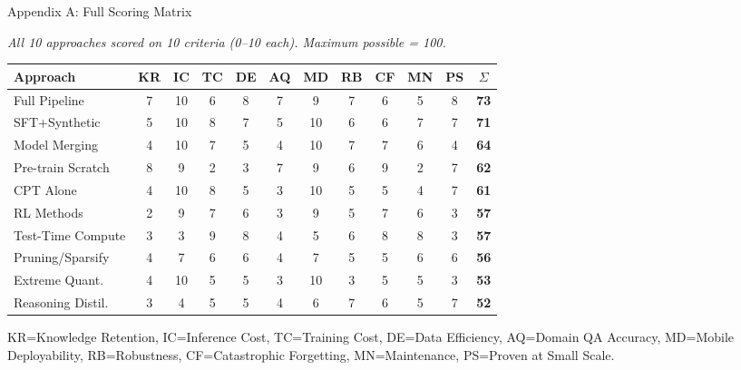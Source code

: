 \documentclass[aspectratio=169,11pt]{beamer}
\begin{document}
\begin{frame}[shrink=15]{Appendix A: Full Scoring Matrix}
\begin{center}
  {\small\color{slate}\itshape
   All 10 approaches scored on 10 criteria (0--10 each).  Maximum possible = 100.}
  \vspace{5pt}
  \begin{adjustbox}{max width=\textwidth}
  \begin{tabular}{@{}lcccccccccc|c@{}}
    \toprule
    \textbf{Approach}
      & \textbf{KR} & \textbf{IC} & \textbf{TC} & \textbf{DE}
      & \textbf{AQ} & \textbf{MD} & \textbf{RB} & \textbf{CF}
      & \textbf{MN} & \textbf{PS} & $\Sigma$\\
    \midrule
    \rowcolor{goldsoft}
    Full Pipeline & 7&10&6&8&7&9&7&6&5&8 & \textbf{73}\\
    \rowcolor{forestsoft}
    SFT+Synthetic & 5&10&8&7&5&10&6&6&7&7 & \textbf{71}\\
    Model Merging  & 4&10&7&5&4&10&7&7&6&4 & \textbf{64}\\
    Pre-train Scratch & 8&9&2&3&7&9&6&9&2&7 & \textbf{62}\\
    CPT Alone      & 4&10&8&5&3&10&5&5&4&7 & \textbf{61}\\
    RL Methods     & 2&9&7&6&3&9&5&7&6&3  & \textbf{57}\\
    Test-Time Compute & 3&3&9&8&4&5&6&8&8&3 & \textbf{57}\\
    \rowcolor{crimsonsoft}
    Pruning/Sparsify & 4&7&6&6&4&7&5&5&6&6 & \textbf{56}\\
    \rowcolor{crimsonsoft}
    Extreme Quant. & 4&10&5&5&3&10&3&5&5&3 & \textbf{53}\\
    \rowcolor{crimsonsoft}
    Reasoning Distil. & 3&4&5&5&4&6&7&6&5&7 & \textbf{52}\\
    \bottomrule
  \end{tabular}
  \end{adjustbox}
  \vspace{4pt}
  \scriptsize
  KR=Knowledge Retention, IC=Inference Cost, TC=Training Cost, DE=Data Efficiency,
  AQ=Domain QA Accuracy, MD=Mobile Deployability, RB=Robustness,
  CF=Catastrophic Forgetting, MN=Maintenance, PS=Proven at Small Scale.
\end{center}
\end{frame}
\end{document}
